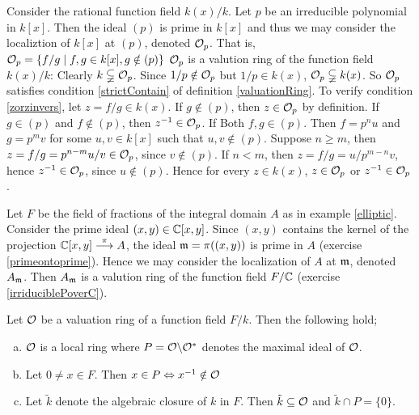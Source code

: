 \begin{example} \label{rationalValuationRing}
    Consider the rational function field $k(x)/k$. Let $p$ be an irreducible 
    polynomial in $k[x]$. Then the ideal $(p)$ is prime in $k[x]$ and thus we
    may consider the localiztion of $k[x]$ at $(p)$, denoted $\mathcal{O}_p$. That is, 
    $\mathcal{O}_p = \lbrace f/g \mid f,g\in k[x], g\notin (p)\rbrace$ 
    $\mathcal{O}_p$ is a valution ring of the function field $k(x)/k$: 
    Clearly $k\subsetneqq \mathcal{O}_p$. Since $1/p \notin \mathcal{O}_p $ but $1/p \in k(x)$,
    $\mathcal{O}_p \subsetneqq k(x)$. So $\mathcal{O}_p$ satisfies condition \eqref{strictContain} 
    of definition \ref{valuationRing}. To verify condition \eqref{zorzinvers},
    let $z = f/g \in k(x)$. If $g \notin (p)$,
    then $z \in \mathcal{O}_p$ by definition. If $g \in (p)$ and $f \notin (p)$, then $z^{-1}\in \mathcal{O}_p$. 
    If Both $f,g\in (p)$. Then $f = p^nu$ and $g = p^mv$ for some $u,v \in k[x]$
    such that $u,v \notin (p)$. Suppose $n \geq m $, then $z = f/g = p^{n-m}u/v \in \mathcal{O}_p$,
    since $v \notin (p)$. If $n < m$, then $z = f/g = u/p^{m-n}v$, 
    hence $z^{-1}\in \mathcal{O}_p$, since $u \notin (p)$. Hence 
    for every $z \in k(x)$, $z \in \mathcal{O}_p$ or $z^{-1} \in \mathcal{O}_p$.
\end{example}

\begin{example}
    Let $F$ be the field of fractions of the integral domain $A$ as 
    in example \ref{elliptic}. Consider the prime ideal $(x,y) \in \mathbb{C}[x,y]$.
    Since $(x,y)$ contains the kernel of the projection 
    $\mathbb{C}[x,y] \stackrel{\pi}{\longrightarrow} A$, the ideal $\mathfrak{m} = \pi((x,y))$ 
    is prime in $A$ (exercise \ref{primeontoprime}). 
    Hence we may consider the localization of $A$ at $\mathfrak{m}$, denoted $A_{\mathfrak{m}}$.
    Then $A_{\mathfrak{m}}$ is a valution ring of the function field $F/\mathbb{C}$ 
    (exercise \ref{irriduciblePoverC}).   
\end{example}

\begin{proposition} \label{propAboutValuationRings}
    Let $\mathcal{O}$ be a valuation ring of a function 
    field $F/k$. Then the following hold; 
    \begin{enumerate}[(a)]
        \item $\mathcal{O}$ is a local ring where $P = \mathcal{O} \backslash \mathcal{O}^*$ 
        denotes the maximal ideal of $\mathcal{O}$.
        \item Let $0 \neq x \in F$. Then $x \in P \Leftrightarrow x^{-1} \notin \mathcal{O} $
        \item Let $\tilde{k}$ denote the algebraic closure of $k$ in $F$. 
        Then $\tilde{k} \subseteq \mathcal{O}$ and $\tilde{k} \cap P = \lbrace 0 \rbrace $. 
    \end{enumerate}
\end{proposition}

